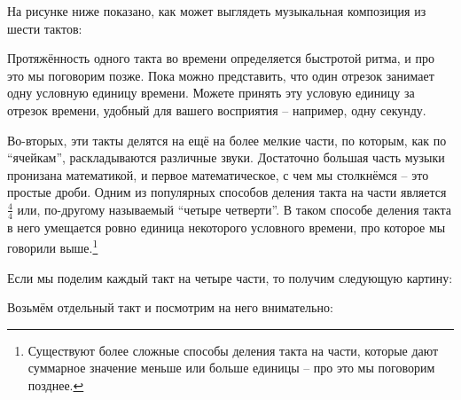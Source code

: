 \documentclass[a4paper,twoside]{book}
\begin{document}
На рисунке ниже показано, как может выглядеть музыкальная композиция из шести
тактов:


Протяжённость одного такта во времени определяется быстротой ритма, и про это мы
поговорим позже. Пока можно представить, что один отрезок занимает одну условную
единицу времени. Можете принять эту условую единицу за отрезок времени, удобный
для вашего восприятия -- например, одну секунду.

Во-вторых, эти такты делятся на ещё на более мелкие части, по которым, как по
``ячейкам'', раскладываются различные звуки. Достаточно большая часть музыки
пронизана математикой, и первое математическое, с чем мы столкнёмся -- это
простые дроби. Одним из популярных способов деления такта на части является
$\frac{4}{4}$ или, по-другому называемый ``четыре четверти''. В таком способе
деления такта в него умещается ровно единица некоторого условного времени, про
которое мы говорили выше.\footnote{Существуют более сложные способы деления
такта на части, которые дают суммарное значение меньше или больше единицы -- про
это мы поговорим позднее.}

Если мы поделим каждый такт на четыре части, то получим следующую картину:


Возьмём отдельный такт и посмотрим на него внимательно:

\end{document}
